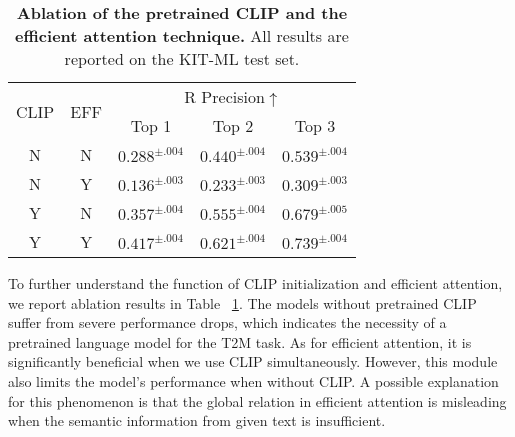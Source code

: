\begin{table}[ht]
\centering
\caption{\textbf{Ablation of the pretrained CLIP and the efficient attention technique.} All results are reported on the KIT-ML test set.}
\label{tab:kit_ablation}
\setlength{\tabcolsep}{1.4mm}
{
\begin{tabular}{ccccc}
\hline

\multirow{2}{1cm}{CLIP} & \multirow{2}{1cm}{\centering EFF} & \multicolumn{3}{c}{\centering R Precision$\uparrow$}  \\
& & Top 1 & Top 2 & Top 3 \\
\hline
N & N & $0.288^{\pm.004}$ & $0.440^{\pm.004}$ & $0.539^{\pm.004}$ \\
N & Y & $0.136^{\pm.003}$ & $0.233^{\pm.003}$ & $0.309^{\pm.003}$ \\
Y & N & $0.357^{\pm.004}$ & $0.555^{\pm.004}$ & $0.679^{\pm.005}$ \\
Y & Y & $\mathbf{0.417^{\pm.004}}$ & $\mathbf{0.621^{\pm.004}}$ & $\mathbf{0.739^{\pm.004}}$ \\
\hline
\end{tabular}}
\end{table}

To further understand the function of CLIP initialization and efficient attention, we report ablation results in Table ~\ref{tab:kit_ablation}. The models without pretrained CLIP suffer from severe performance drops, which indicates the necessity of a pretrained language model for the T2M task. As for efficient attention, it is significantly beneficial when we use CLIP simultaneously. However, this module also limits the model's performance when without CLIP. A possible explanation for this phenomenon is that the global relation in efficient attention is misleading when the semantic information from given text is insufficient.

